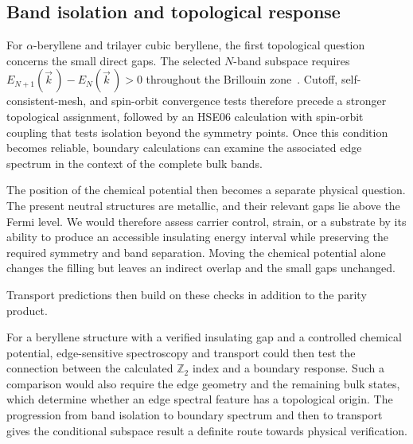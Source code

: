 \subsection{Band isolation and topological response}

For $\alpha$-beryllene and trilayer cubic beryllene, the first topological question concerns the small direct gaps.
The selected $N$-band subspace requires $E_{N+1}(\vec{k}\,)-E_N(\vec{k}\,)>0$ throughout the Brillouin zone~\cite{fu2007topological,gresch2017z2pack}.
Cutoff, self-consistent-mesh, and spin-orbit convergence tests therefore precede a stronger topological assignment, followed by an HSE06 calculation with spin-orbit coupling that tests isolation beyond the symmetry points.
Once this condition becomes reliable, boundary calculations can examine the associated edge spectrum in the context of the complete bulk bands.

The position of the chemical potential then becomes a separate physical question.
The present neutral structures are metallic, and their relevant gaps lie above the Fermi level.
We would therefore assess carrier control, strain, or a substrate by its ability to produce an accessible insulating energy interval while preserving the required symmetry and band separation.
Moving the chemical potential alone changes the filling but leaves an indirect overlap and the small gaps unchanged.

Transport predictions then build on these checks in addition to the parity product.

For a beryllene structure with a verified insulating gap and a controlled chemical potential, edge-sensitive spectroscopy and transport could then test the connection between the calculated $\mathbb{Z}_2$ index and a boundary response.
Such a comparison would also require the edge geometry and the remaining bulk states, which determine whether an edge spectral feature has a topological origin.
The progression from band isolation to boundary spectrum and then to transport gives the conditional subspace result a definite route towards physical verification.

